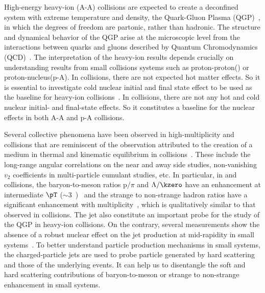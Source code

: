 \documentclass[ALICE,manyauthors]{cernphprep}
\begin{document}
High-energy heavy-ion (A-A) collisions are expected to create a deconfined system with extreme temperature and density, the Quark-Gluon Plasma (QGP)~\cite{Rafelski:126179, Satz:2000bn, Shuryak:1983ni, Jacak:2012dx, Cleymans:1985wb, Bass:1998vz, BraunMunzinger:2007zz}, in which the degrees of freedom are partonic, rather than hadronic.
The structure and dynamical behavior of the QGP arise at the microscopic level from the interactions between quarks and gluons described by Quantum Chromodynamics (QCD)~\cite{Laermann:2003cv, Gupta:2011wh, Bhattacharya:2014ara}.
The interpretation of the heavy-ion results depends crucially on understanding results from small collisions systems such as proton-proton(\pp) or proton-nucleus(p-A).
In \pPb collisions, there are not expected hot matter effects.
So it is essential to investigate cold nuclear initial and final state effect to be used as the baseline for heavy-ion collisions~\cite{Salgado:2011wc, Eskola:2016oht}.
In \pp collisions, there are not any hot and cold nuclear initial- and final-state effects.
So it constitutes a baseline for the nuclear effects in both A-A and p-A collisions.

Several collective phenomena have been observed in high-multiplicity \pp and \pPb collisions that are reminiscent of the observation attributed to the creation of a medium in thermal and kinematic equilibrium in \PbPb collisions~\cite{Acharya:2019vdf, Aad:2015gqa, Abelev:2012ola, ABELEV:2013wsa, Khachatryan:2015waa, Abelev:2014uua, Adam:2015vsf}.
These include the long-range angular correlations on the near and away side studies, non-vanishing $v_{2}$ coefficients in multi-particle cumulant studies, etc.
In particular, in \pp and \pPb collisions, the baryon-to-meson ratios p$/\pi$ and $\Lambda/\kzero$ have an enhancement at intermediate $\pT$ ($\sim 3$~\GeVc)~\cite{Acharya:2018orn, Khachatryan:2016yru, Abelev:2013xaa, ALICE:2017jyt} and the strange to non-strange hadron ratios have a significant enhancement with multiplicity~\cite{Abelev:2013haa, ALICE:2017jyt, Khachatryan:2016yru}, which is qualitatively similar to that observed in \PbPb collisions.
The jet also constitute an important probe for the study of the QGP in heavy-ion collisions. 
On the contrary, several measurements show the absence of a robust nuclear effect on the jet production at mid-rapidity in small systems~\cite{Acharya:2019jyg, Acharya:2019tku, ALICE:2014dla, Abelev:2013fn, Acharya:2018eat, Acharya:2017okq, Adam:2015xea, Adam:2016jfp}.
To better understand particle production mechanisms in small systems, the charged-particle jets are used to probe particle generated by hard scattering and those of the underlying events.
It can help us to disentangle the soft and hard scattering contributions of baryon-to-meson or strange to non-strange enhancement in small systems. 
\end{document}
